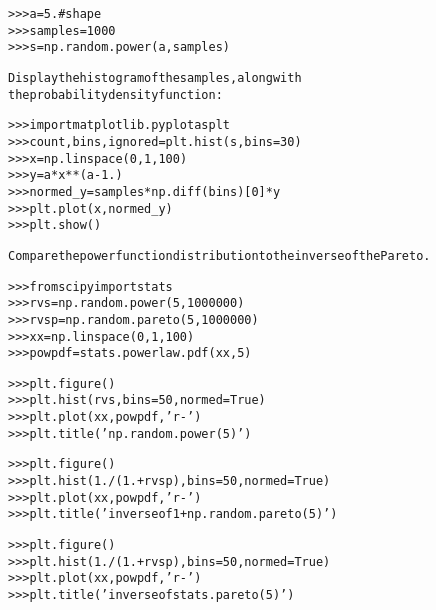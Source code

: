 \begin{boxedminipage}{\funcwidth}
\begin{alltt}
{\textgreater}{\textgreater}{\textgreater} a = 5. \# shape
{\textgreater}{\textgreater}{\textgreater} samples = 1000
{\textgreater}{\textgreater}{\textgreater} s = np.random.power(a, samples)

Display the histogram of the samples, along with
the probability density function:

{\textgreater}{\textgreater}{\textgreater} import matplotlib.pyplot as plt
{\textgreater}{\textgreater}{\textgreater} count, bins, ignored = plt.hist(s, bins=30)
{\textgreater}{\textgreater}{\textgreater} x = np.linspace(0, 1, 100)
{\textgreater}{\textgreater}{\textgreater} y = a*x**(a-1.)
{\textgreater}{\textgreater}{\textgreater} normed\_y = samples*np.diff(bins)[0]*y
{\textgreater}{\textgreater}{\textgreater} plt.plot(x, normed\_y)
{\textgreater}{\textgreater}{\textgreater} plt.show()

Compare the power function distribution to the inverse of the Pareto.

{\textgreater}{\textgreater}{\textgreater} from scipy import stats
{\textgreater}{\textgreater}{\textgreater} rvs = np.random.power(5, 1000000)
{\textgreater}{\textgreater}{\textgreater} rvsp = np.random.pareto(5, 1000000)
{\textgreater}{\textgreater}{\textgreater} xx = np.linspace(0,1,100)
{\textgreater}{\textgreater}{\textgreater} powpdf = stats.powerlaw.pdf(xx,5)

{\textgreater}{\textgreater}{\textgreater} plt.figure()
{\textgreater}{\textgreater}{\textgreater} plt.hist(rvs, bins=50, normed=True)
{\textgreater}{\textgreater}{\textgreater} plt.plot(xx,powpdf,'r-')
{\textgreater}{\textgreater}{\textgreater} plt.title('np.random.power(5)')

{\textgreater}{\textgreater}{\textgreater} plt.figure()
{\textgreater}{\textgreater}{\textgreater} plt.hist(1./(1.+rvsp), bins=50, normed=True)
{\textgreater}{\textgreater}{\textgreater} plt.plot(xx,powpdf,'r-')
{\textgreater}{\textgreater}{\textgreater} plt.title('inverse of 1 + np.random.pareto(5)')

{\textgreater}{\textgreater}{\textgreater} plt.figure()
{\textgreater}{\textgreater}{\textgreater} plt.hist(1./(1.+rvsp), bins=50, normed=True)
{\textgreater}{\textgreater}{\textgreater} plt.plot(xx,powpdf,'r-')
{\textgreater}{\textgreater}{\textgreater} plt.title('inverse of stats.pareto(5)')
\end{alltt}

\setlength{\parskip}{1ex}
    \end{boxedminipage}

    \label{trunk:qstkutil:bollinger:rand}

